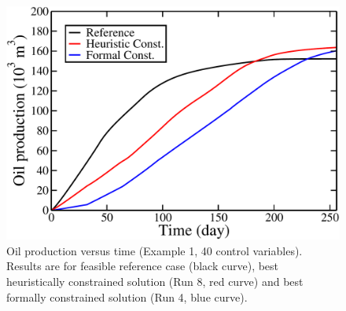 \begin{figure} [ht]
\begin{center}
\includegraphics[totalheight=2.17in,angle=0]{figures/RevenuePI2.pdf}
\end{center}
\caption{Oil production versus time (Example 1, 40 control variables). Results are for
  feasible reference case (black curve), best heuristically constrained solution (Run 8, red curve)
  and best formally constrained solution (Run 4, blue curve).}
\label{fig:PIRevenue}
\end{figure}
